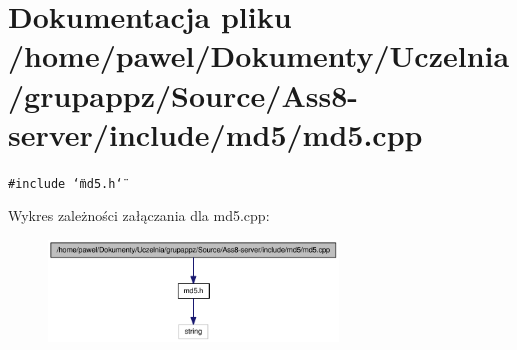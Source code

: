 \hypertarget{a00009}{
\section{Dokumentacja pliku /home/pawel/Dokumenty/Uczelnia/grupappz/Source/Ass8-server/include/md5/md5.cpp}
\label{da/da0/a00009}
}
{\tt \#include \char`\"{}md5.h\char`\"{}}\par


Wykres zależności załączania dla md5.cpp:\nopagebreak
\begin{figure}[H]
\begin{center}
\leavevmode
\includegraphics[width=218pt]{d3/de7/a00039}
\end{center}
\end{figure}
